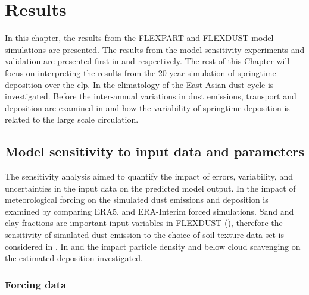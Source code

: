 \chapter{Results}\label{Chap:Results}
In this chapter, the results from the FLEXPART and FLEXDUST model simulations are presented. 
The results from the model sensitivity experiments and validation are presented first in  and  respectively. 
The rest of this Chapter will focus on interpreting the results from the 20-year simulation of springtime deposition over the \acrshort{clp}. 
In  the climatology of the East Asian dust cycle is investigated.   
Before the inter-annual variations in dust  emissions, transport and deposition are examined in  and how the variability of springtime deposition is related to the large scale circulation. 


\section{Model sensitivity to input data and parameters}\label{sec:sensitvity_experiment}
The sensitivity analysis aimed to quantify the impact of errors, variability, and uncertainties in the input data on the predicted model output. 
In  the impact of meteorological forcing on the simulated dust emissions and deposition is examined by comparing ERA5, and ERA-Interim forced simulations. 
Sand and clay fractions are important input variables in FLEXDUST (), therefore the sensitivity of simulated dust emission to the choice of soil texture data set is considered in . 
In  and  the impact particle density and below cloud scavenging on the estimated deposition investigated. 
\subsection{Forcing data}\label{sec:sens_forcing}

